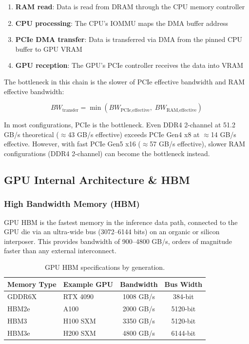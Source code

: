 \documentclass[11pt,a4paper]{article}
\theoremstyle{definition}
\begin{document}
\begin{enumerate}
  \item \textbf{RAM read}: Data is read from DRAM through the CPU memory controller
  \item \textbf{CPU processing}: The CPU's IOMMU maps the DMA buffer address
  \item \textbf{PCIe DMA transfer}: Data is transferred via DMA from the pinned CPU buffer to GPU VRAM
  \item \textbf{GPU reception}: The GPU's PCIe controller receives the data into VRAM
\end{enumerate}

The bottleneck in this chain is the slower of PCIe effective bandwidth and RAM effective bandwidth:

\begin{equation}\label{eq:chain_bottleneck}
BW_{\text{transfer}} = \min(BW_{\text{PCIe,effective}}, \; BW_{\text{RAM,effective}})
\end{equation}

In most configurations, PCIe is the bottleneck. Even DDR4 2-channel at 51.2 GB/s theoretical ($\approx$43 GB/s effective) exceeds PCIe Gen4 x8 at $\approx$14 GB/s effective. However, with fast PCIe Gen5 x16 ($\approx$57 GB/s effective), slower RAM configurations (DDR4 2-channel) can become the bottleneck instead.

\subsection{GPU Internal Architecture \& HBM}

\subsubsection{High Bandwidth Memory (HBM)}

GPU HBM is the fastest memory in the inference data path, connected to the GPU die via an ultra-wide bus (3072--6144 bits) on an organic or silicon interposer. This provides bandwidth of 900--4800 GB/s, orders of magnitude faster than any external interconnect.

\begin{table}[htbp]
\centering
\caption{GPU HBM specifications by generation.}\label{tab:hbm}
\begin{tabular}{llcc}
\toprule
\textbf{Memory Type} & \textbf{Example GPU} & \textbf{Bandwidth} & \textbf{Bus Width} \\
\midrule
GDDR6X  & RTX 4090  & 1008 GB/s & 384-bit \\
HBM2e   & A100      & 2000 GB/s & 5120-bit \\
HBM3    & H100 SXM  & 3350 GB/s & 5120-bit \\
HBM3e   & H200 SXM  & 4800 GB/s & 6144-bit \\
\bottomrule
\end{tabular}
\end{table}
\end{document}
